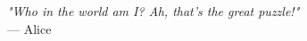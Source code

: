\begin{flushright}
\emph{"Who in the world am I? Ah, that’s the great puzzle!"} \\
— Alice 
\end{flushright}